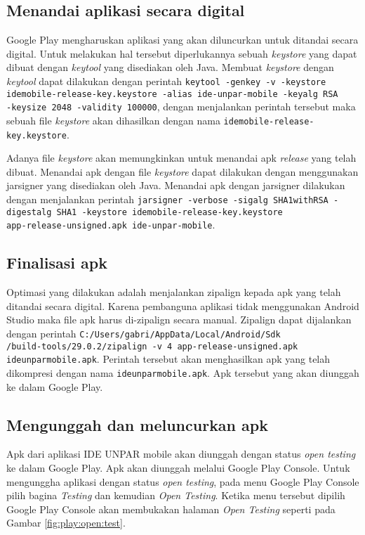 \subsection{Menandai aplikasi secara digital}
Google Play mengharuskan aplikasi yang akan diluncurkan untuk ditandai secara digital. Untuk melakukan hal tersebut diperlukannya sebuah \textit{keystore} yang dapat dibuat dengan \textit{keytool} yang disediakan oleh Java. Membuat \textit{keystore} dengan \textit{keytool} dapat dilakukan dengan perintah \texttt{keytool -genkey -v -keystore idemobile-release-key.keystore -alias ide-unpar-mobile -keyalg RSA \\ -keysize 2048 -validity 100000}, dengan menjalankan perintah tersebut maka sebuah file \textit{keystore} akan dihasilkan dengan nama \texttt{idemobile-release-key.keystore}.

Adanya file \textit{keystore} akan memungkinkan untuk menandai apk \textit{release} yang telah dibuat. Menandai apk dengan file \textit{keystore} dapat dilakukan dengan menggunakan jarsigner yang disediakan oleh Java. Menandai apk dengan jarsigner dilakukan dengan menjalankan perintah \texttt{jarsigner -verbose -sigalg SHA1withRSA -digestalg SHA1 -keystore idemobile-release-key.keystore \\ app-release-unsigned.apk ide-unpar-mobile}. 

\subsection{Finalisasi apk}
Optimasi yang dilakukan adalah menjalankan zipalign kepada apk yang telah ditandai secara digital. Karena pembanguna aplikasi tidak menggunakan Android Studio maka file apk harus di-zipalign secara manual. Zipalign dapat dijalankan dengan perintah \texttt{C:/Users/gabri/AppData/Local/Android/Sdk\\/build-tools/29.0.2/zipalign -v 4 app-release-unsigned.apk ideunparmobile.apk}. Perintah tersebut akan menghasilkan apk yang telah dikompresi dengan nama \texttt{ideunparmobile.apk}. Apk tersebut yang akan diunggah ke dalam Google Play.

\subsection{Mengunggah dan meluncurkan apk}
Apk dari aplikasi IDE UNPAR mobile akan diunggah dengan status \textit{open testing} ke dalam Google Play. Apk akan diunggah melalui Google Play Console. Untuk mengunggha aplikasi dengan status \textit{open testing}, pada menu Google Play Console pilih bagina \textit{Testing} dan kemudian \textit{Open Testing}. Ketika menu tersebut dipilih Google Play Console akan membukakan halaman \textit{Open Testing} seperti pada Gambar \ref{fig:play:open:test}. 

